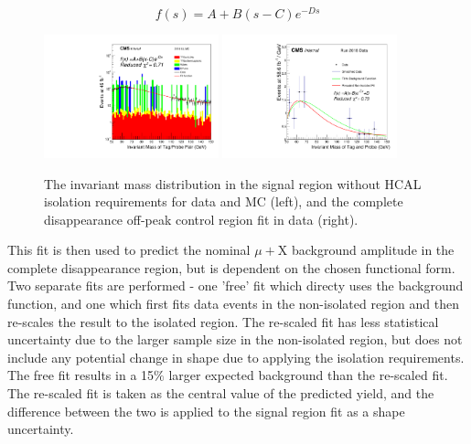 \begin{equation} 
    \label{eq:bkgfunc}
    f(s)=A+B(s-C)e^{-Ds} 
\end{equation}

\begin{figure}[htp]
    \centering
    \includegraphics[width=0.45\textwidth]{figures/offPeakCr_noIso.pdf}
    \hspace{0.01\textwidth}
    \includegraphics[width=0.45\textwidth]{figures/offPeakCr_fit.pdf} 
     \caption[$\mu$+X background fits in the off-peak control region for complete disappearance events]{The invariant mass distribution in the signal region without HCAL isolation requirements for data and MC (left), and the complete disappearance off-peak control region fit in data (right).}
    \label{fig:offpeakfit}
 \end{figure}
 
This fit is then used to predict the nominal $\mu+$X background amplitude in the complete disappearance region, but is dependent on the chosen functional form. 
Two separate fits are performed - one 'free' fit which directy uses the background function, and one which first fits data events in the non-isolated region and then re-scales the result to the isolated region. 
The re-scaled fit has less statistical uncertainty due to the larger sample size in the non-isolated region, but does not include any potential change in shape due to applying the isolation requirements. 
The free fit results in a 15$\%$ larger expected background than the re-scaled fit. 
The re-scaled fit is taken as the central value of the predicted yield, and the difference between the two is applied to the signal region fit as a shape uncertainty.

